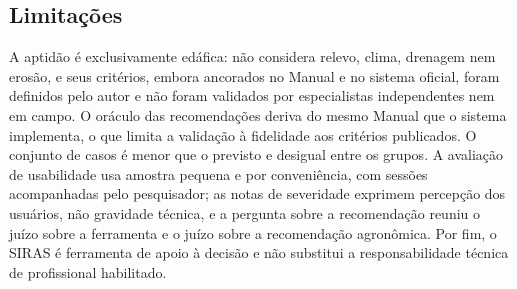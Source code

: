 \subsection{Limitações}\label{sec:res_limitacoes}

A aptidão é exclusivamente edáfica: não considera relevo, clima, drenagem nem erosão, e seus
critérios, embora ancorados no Manual e no sistema oficial, foram definidos pelo autor e não
foram validados por especialistas independentes nem em campo. O oráculo das recomendações deriva
do mesmo Manual que o sistema implementa, o que limita a validação à fidelidade aos critérios
publicados. O conjunto de casos é menor que o previsto e desigual entre os grupos. A avaliação de
usabilidade usa amostra pequena e por conveniência, com sessões acompanhadas pelo pesquisador; as
notas de severidade exprimem percepção dos usuários, não gravidade técnica, e a pergunta sobre a
recomendação reuniu o juízo sobre a ferramenta e o juízo sobre a recomendação agronômica. Por
fim, o SIRAS é ferramenta de apoio à decisão e não substitui a responsabilidade técnica de
profissional habilitado.
